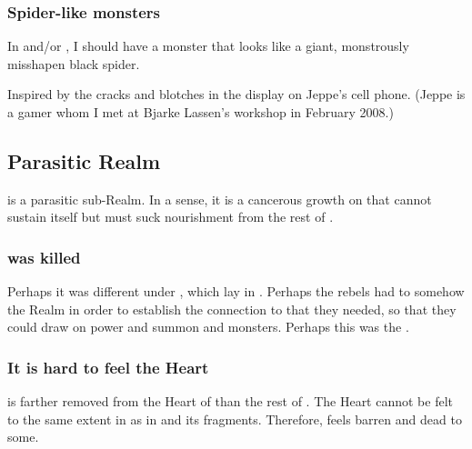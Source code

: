 \subsubsection{Spider-like monsters}
In \Nyx{} and/or \Erebos, I should have a monster that looks like a giant, monstrously misshapen black spider. 

Inspired by the cracks and blotches in the display on Jeppe's cell phone. (Jeppe is a gamer whom I met at Bjarke Lassen's workshop in February 2008.) 


















\subsection{Parasitic Realm}
\Nyx{} is a parasitic sub-Realm. 
In a sense, it is a cancerous growth on \Miith{} that cannot sustain itself but must suck nourishment from the rest of \Miith{}. 





\subsubsection{\Nyx{} was killed}
Perhaps it was different under , which lay in \Nyx. 
Perhaps the rebels had to somehow  the Realm in order to establish the connection to \Erebos{} that they needed, so that they could draw on \Erebean{} power and summon \banes{} and monsters. 
Perhaps this was the . 




\subsubsection{It is hard to feel the Heart}
\Nyx{} is farther removed from the Heart of \Miith{} than the rest of \Miith{}. 
The Heart cannot be felt to the same extent in \Nyx{} as in  and its fragments. 
Therefore, \Nyx{} feels barren and dead to some. 

